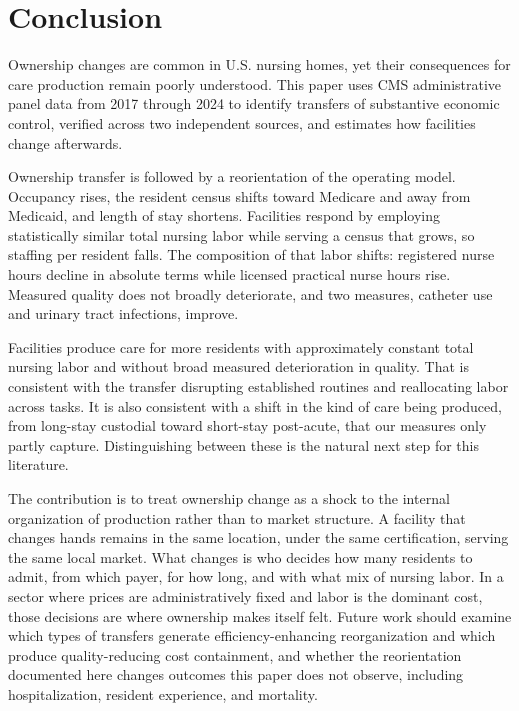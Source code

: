 \documentclass[12pt]{article}
\begin{document}
\section{Conclusion} \label{sec:conclusion}

Ownership changes are common in U.S. nursing homes, yet their consequences for care production remain poorly understood. This paper uses CMS administrative panel data from 2017 through 2024 to identify transfers of substantive economic control, verified across two independent sources, and estimates how facilities change afterwards.

Ownership transfer is followed by a reorientation of the operating model. Occupancy rises, the resident census shifts toward Medicare and away from Medicaid, and length of stay shortens. Facilities respond by employing statistically similar total nursing labor while serving a census that grows, so staffing per resident falls. The composition of that labor shifts: registered nurse hours decline in absolute terms while licensed practical nurse hours rise. Measured quality does not broadly deteriorate, and two measures, catheter use and urinary tract infections, improve.

Facilities produce care for more residents with approximately constant total nursing labor and without broad measured deterioration in quality. That is consistent with the transfer disrupting established routines and reallocating labor across tasks. It is also consistent with a shift in the kind of care being produced, from long-stay custodial toward short-stay post-acute, that our measures only partly capture. Distinguishing between these is the natural next step for this literature.

The contribution is to treat ownership change as a shock to the internal organization of production rather than to market structure. A facility that changes hands remains in the same location, under the same certification, serving the same local market. What changes is who decides how many residents to admit, from which payer, for how long, and with what mix of nursing labor. In a sector where prices are administratively fixed and labor is the dominant cost, those decisions are where ownership makes itself felt. Future work should examine which types of transfers generate efficiency-enhancing reorganization and which produce quality-reducing cost containment, and whether the reorientation documented here changes outcomes this paper does not observe, including hospitalization, resident experience, and mortality.
\end{document}
